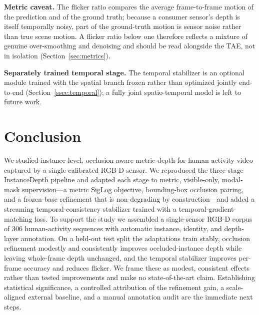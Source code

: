 \documentclass[sigconf, review=true]{acmart}
\begin{document}
\smallskip\noindent\textbf{Metric caveat.}
The flicker ratio compares the average frame-to-frame motion of the prediction
and of the ground truth; because a consumer sensor's depth is itself temporally
noisy, part of the ground-truth motion is sensor noise rather than true scene
motion. A flicker ratio below one therefore reflects a mixture of genuine
over-smoothing and denoising and should be read alongside the TAE, not in
isolation (Section~\ref{sec:metrics}).

\smallskip\noindent\textbf{Separately trained temporal stage.}
The temporal stabilizer is an optional module trained with the spatial branch
frozen rather than optimized jointly end-to-end
(Section~\ref{ssec:temporal}); a fully joint spatio-temporal model is left to
future work.

\section{Conclusion}
\label{sec:conclusion}
We studied instance-level, occlusion-aware metric depth for human-activity video
captured by a single calibrated RGB-D sensor. We reproduced the three-stage
InstanceDepth pipeline and adapted each stage to metric, visible-only,
modal-mask supervision---a metric SigLog objective, bounding-box occlusion
pairing, and a frozen-base refinement that is non-degrading by
construction---and added a streaming temporal-consistency stabilizer trained
with a temporal-gradient-matching loss. To support the study we assembled a
single-sensor RGB-D corpus of $306$ human-activity sequences with automatic
instance, identity, and depth-layer annotation. On a held-out test split the
adaptations train stably, occlusion refinement modestly and consistently
improves occluded-instance depth while leaving whole-frame depth unchanged, and
the temporal stabilizer improves per-frame accuracy and reduces flicker. We
frame these as modest, consistent effects rather than tested improvements and
make no state-of-the-art claim. Establishing statistical significance, a
controlled attribution of the refinement gain, a scale-aligned external
baseline, and a manual annotation audit are the immediate next steps.



\end{document}
